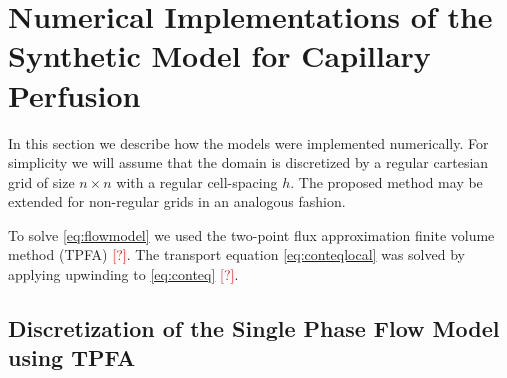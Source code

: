 \documentclass[paper=a4, fontsize=11pt,parskip=half,headings=small]{scrartcl}
\newcommand{\missingsource}{\textcolor{red}{[?]}}
\begin{document}
	
	
	

	
	\section{Numerical Implementations of the Synthetic Model for Capillary Perfusion}
	
	In this section we describe how the models were implemented numerically.
	For simplicity we will assume that the domain is discretized by a regular cartesian grid of size $n \times n$ with a regular cell-spacing $h$.
	The proposed method may be extended for non-regular grids in an analogous fashion.
	
	To solve \eqref{eq:flowmodel} we used the two-point flux approximation finite volume method (TPFA) \missingsource. 
	The transport equation \eqref{eq:conteqlocal} was solved by applying upwinding to \eqref{eq:conteq} \missingsource.

	\subsection{Discretization of the Single Phase Flow Model using TPFA} \label{sec:numflow}
\end{document}
